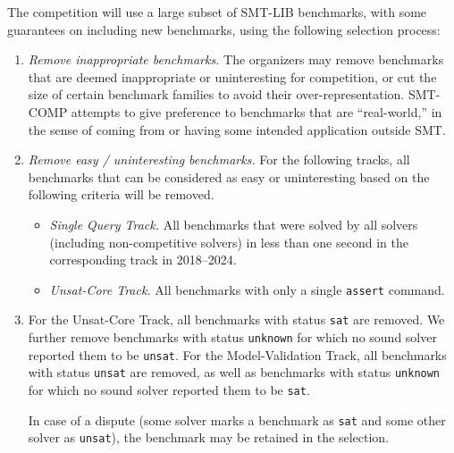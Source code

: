 \documentclass[12pt]{article}
\newcommand{\maintrack}{Single Query Track\xspace}
\newcommand{\ucoretrack}{Unsat-Core Track\xspace}
\newcommand{\mvaltrack}{Model-Validation Track\xspace}
\begin{document}
 \label{benchmark-selection}
The competition will use a large subset of SMT-LIB benchmarks, with some
guarantees on including new benchmarks, using the following selection process:
\begin{enumerate}
\item \emph{Remove inappropriate benchmarks.} The
  organizers may remove benchmarks that are deemed inappropriate or
  uninteresting for competition, or cut the size of certain benchmark
  families to avoid their over-representation.  SMT-COMP attempts to
  give preference to benchmarks that are ``real-world,'' in the sense
  of coming from or having some intended application outside SMT.
\item \emph{Remove easy / uninteresting benchmarks.}
  For the following tracks, all benchmarks that can be
  considered as easy or uninteresting based on the following criteria
  will be removed.
  \begin{itemize}
    \item \emph{\maintrack.} All benchmarks that were solved by all
      solvers (including non-competitive solvers) in less than one second in
          the corresponding track in 2018--2024.
    \item \emph{\ucoretrack.} All benchmarks with only a single \texttt{assert} command.
  \end{itemize}

\item
  For the \ucoretrack, all benchmarks with status
  \texttt{sat} are removed.  We further remove benchmarks with status
  \texttt{unknown} for which no sound solver reported them to be
  \texttt{unsat}.
  For the \mvaltrack,  all benchmarks with status \texttt{unsat} are removed,
  as well as benchmarks with status
  \texttt{unknown} for which no sound solver reported them to be
  \texttt{sat}.

  In case of a dispute (some solver marks a benchmark as \texttt{sat}
  and some other solver as \texttt{unsat}), the benchmark may be retained in
  the selection.


\end{enumerate}
\end{document}

